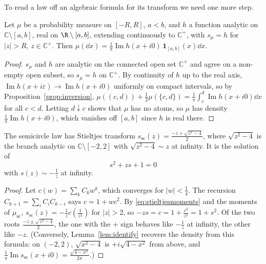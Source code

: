 To read a law off an algebraic formula for its transform we need one more step.

\begin{lemma}[identification]\label{lem:identify}
Let $\mu$ be a probability measure on $[-R,R]$, $a<b$, and $h$ a function analytic on $\mathbb C\setminus[a,b]$, real on $\R\setminus[a,b]$, extending continuously to $\overline{\mathbb C^+}$, with $s_\mu=h$ for $|z|>R$, $z\in\mathbb C^+$. Then
$\mu(\dd x)=\frac1\pi\operatorname{Im}h(x+i0)\,\mathbf 1_{[a,b]}(x)\dd x$.
\end{lemma}

\begin{proof}
$s_\mu$ and $h$ are analytic on the connected open set $\mathbb C^+$ and agree on a non-empty open subset, so $s_\mu=h$ on $\mathbb C^+$. By continuity of $h$ up to the real axis, $\operatorname{Im}h(x+i\varepsilon)\to\operatorname{Im}h(x+i0)$
uniformly on compact intervals, so by Proposition~\ref{prop:inversion}, $\mu((c,d))+\frac12\mu(\{c,d\})=\frac1\pi\int_c^d\operatorname{Im}h(x+i0)\dd x$ for all $c<d$. Letting $d\downarrow c$ shows that $\mu$ has no atoms, so $\mu$ has density
$\frac1\pi\operatorname{Im}h(x+i0)$, which vanishes off $[a,b]$ since $h$ is real there.
\end{proof}

\begin{proposition}\label{prop:scstieltjes}
The semicircle law has Stieltjes transform $s_{\mathrm{sc}}(z)=\frac{-z+\sqrt{z^2-4}}2$, where $\sqrt{z^2-4}$ is the branch analytic on $\mathbb C\setminus[-2,2]$ with $\sqrt{z^2-4}\sim z$ at infinity. It is the solution of
\[
s^2+zs+1=0
\]
with $s(z)\sim-\frac1z$ at infinity.
\end{proposition}

\begin{proof}
Let $c(w)=\sum_kC_kw^k$, which converges for $|w|<\frac14$. The recursion $C_{k+1}=\sum_iC_iC_{k-i}$ says $c=1+wc^2$. By \eqref{eq:stieltjesmoments} and the moments of $\mu_{\mathrm{sc}}$, $s_{\mathrm{sc}}(z)=-\frac1zc(\frac1{z^2})$ for $|z|>2$, so
$-zs=c=1+\frac{c^2}{z^2}=1+s^2$. Of the two roots $\frac{-z\pm\sqrt{z^2-4}}2$, the one with the $+$ sign behaves like $-\frac1z$ at infinity, the other like $-z$. (Conversely, Lemma~\ref{lem:identify} recovers the density from this
formula: on $(-2,2)$, $\sqrt{x^2-4}$ is $+i\sqrt{4-x^2}$ from above, and $\frac1\pi\operatorname{Im}s_{\mathrm{sc}}(x+i0)=\frac{\sqrt{4-x^2}}{2\pi}$.)
\end{proof}

